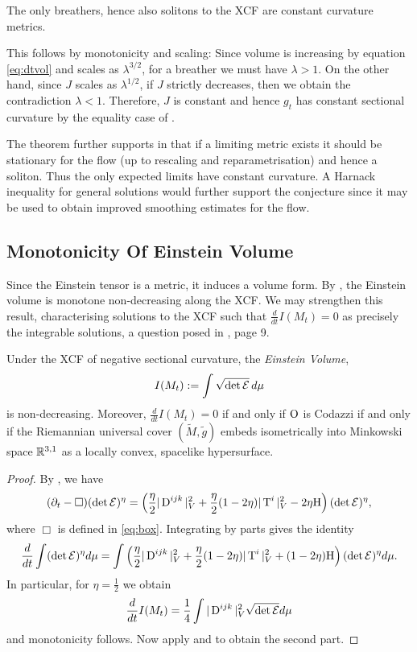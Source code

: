 \documentclass[a4paper,12pt]{amsart}
\begin{document}
\begin{thm}[{\cite{MR2302600}}]
The only breathers, hence also solitons to the XCF are constant curvature metrics.
\end{thm}

This follows by monotonicity and scaling: Since volume is increasing by equation \eqref{eq:dtvol} and scales as \(\lambda^{3/2}\), for a breather we must have \(\lambda > 1\). On the other hand, since \(J\) scales as \(\lambda^{1/2}\), if \(J\) strictly decreases, then we obtain the contradiction \(\lambda < 1\). Therefore, \(J\) is constant and hence \(g_t\) has constant sectional curvature by the equality case of .

The theorem further supports  in that if a limiting metric exists it should be stationary for the flow (up to rescaling and reparametrisation) and hence a soliton. Thus the only expected limits have constant curvature. A Harnack inequality for general solutions would further support the conjecture since it may be used to obtain improved smoothing estimates for the flow.

\subsection{Monotonicity Of Einstein Volume}
\label{subsec:xcf_volume}

Since the Einstein tensor is a metric, it induces a volume form. By \cite[Proposition 9]{MR2055396}, the Einstein volume is monotone non-decreasing along the XCF. We may strengthen this result, characterising solutions to the XCF such that \(\frac{d}{dt} I(M_t) = 0\) as precisely the integrable solutions, a question posed in \cite{MR2055396}, page 9.

\begin{thm}
\label{thm:volume_monotonicity}
Under the XCF of negative sectional curvature, the \emph{Einstein Volume},
\[
I(M_t):=\int \sqrt{\det\operatorname{\mathcal{E}}}\,d\mu
\]
is non-decreasing. Moreover, \(\frac{d}{dt} I(M_t)= 0\) if and only if \(\operatorname{O}\) is Codazzi if and only if the Riemannian universal cover \((\tilde{M}, \tilde{g})\) embeds isometrically into Minkowski space \(\mathbb{R}^{3,1}\) as a locally convex, spacelike hypersurface.
\end{thm}

\begin{proof}
By \cite[Proposition 9]{MR2055396}, we have
\[
(\partial_t - \Box) (\det\operatorname{\mathcal{E}})^\eta = \left(\frac{\eta}{2}|\operatorname{D}^{ijk}|_V^2 + \frac{\eta}{2}(1-2\eta)|\operatorname{T}^i|^2_V - 2\eta \mathrm{H}\right)(\det\operatorname{\mathcal{E}})^\eta,
\]
where \(\Box\) is defined in \eqref{eq:box}. Integrating by parts gives the identity
\[
\frac{d}{dt}\int(\det\operatorname{\mathcal{E}})^\eta d\mu = \int \left(\frac{\eta}{2}|\operatorname{D}^{ijk}|_V^2 + \frac{\eta}{2}(1-2\eta)|\operatorname{T}^i|^2_V + (1-2\eta)\mathrm{H}\right)(\det\operatorname{\mathcal{E}})^\eta d\mu.
\]
In particular, for $\eta=\frac{1}{2}$ we obtain
\[
\frac{d}{dt}I(M_t) = \frac{1}{4}\int |\operatorname{D}^{ijk}|_V^2\sqrt{\det\operatorname{\mathcal{E}}}d\mu
\]
and monotonicity follows. Now apply  and  to obtain the second part.
\end{proof}
\end{document}
